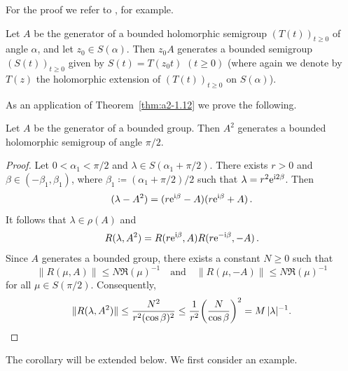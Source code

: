 For the proof we refer to \textcite{davies:1980}, for example.
\begin{remark*}\label{rem:a2-1.6-kgk}
Let $A$ be the generator of a bounded holomorphic semigroup $(T(t))_{t \geq 0}$ 
of angle $\alpha$, and let $z_{0} \in S(\alpha)$.
Then $z_{0}A$ generates a bounded semigroup 
$(S(t))_{t \geq 0}$ given by $S(t) = T(z_{0}t)$  $(t \geq 0)$ (where again we denote by $T(z)$ the holomorphic extension of\/ $(T(t))_{t \geq 0}$ on $S(\alpha)$).
\end{remark*}
As an application of Theorem~\ref{thm:a2-1.12}  we prove the following.
\begin{corollary}\label{cor:a2-1.13}
Let $A$ be the generator of a bounded group.
Then $A^{2}$ generates a bounded holomorphic semigroup of angle $\pi/2$.
\end{corollary}
\begin{proof}
Let $0 < \alpha_{1} < \pi/2$ and $\lambda \in S(\alpha_{1} + \pi/2)$.
There exists $r > 0$ and $\beta \in (-\beta_{1},\beta_{1})$,
where $\beta_{1} \coloneq (\alpha_{1} + \pi/2)/2$
such that $\lambda = r^{2}\mathrm{e}^{\mathrm{i} 2\beta}$.
Then 
\[
(\lambda - A^{2}) = (r\mathrm{e}^{\mathrm{i}\beta} - A)(r\mathrm{e}^{\mathrm{i}\beta} + A) \, .
\] 
It follows that $\lambda \in \rho(A)$ and 
\begin{equation}\label{eq:a2-1.7}
    R(\lambda,A^{2}) = R(r\mathrm{e}^{\mathrm{i}\beta},A)R(r\mathrm{e}^{-\mathrm{i}\beta},-A) \, .
\end{equation}
Since $A$ generates a bounded group, there exists a constant $N \geq 0$ such that 
%
\[
	\|R(\mu,A)\| \leq N\Re(\mu)^{-1} \quad \text{and} \quad \|R(\mu,-A)\| \leq N \Re(\mu)^{-1} 
\]
%
for all $\mu \in S(\pi/2)$.
Consequently, 
%
\begin{equation*}
	\|R(\lambda,A^{2})\| \leq \frac{N^{2}}{r^{2} (\cos\beta)^{2}} 
		\leq \frac{1}{r^{2}}\mleft( \frac{N}{\cos\beta} \mright)^{2} = M\,|\lambda|^{-1} .
\qedhere
\end{equation*}
%
\end{proof}
The corollary will be extended below.
We first consider an example.
